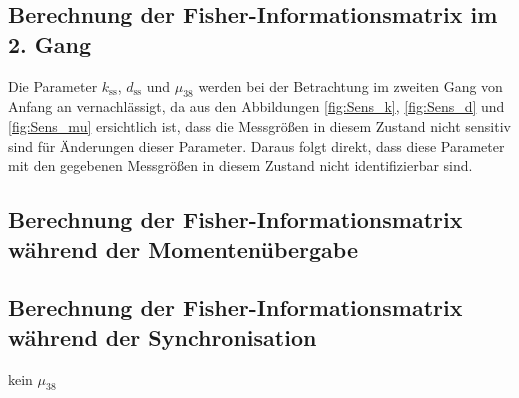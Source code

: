 \subsection{Berechnung der Fisher-Informationsmatrix im 2. Gang}
Die Parameter $k_\mathrm{ss}$, $d_\mathrm{ss}$ und $\mu_{38}$ werden bei der Betrachtung im zweiten Gang von Anfang an vernachlässigt, da aus den Abbildungen \ref{fig:Sens_k}, \ref{fig:Sens_d} und \ref{fig:Sens_mu} ersichtlich ist, dass die Messgrößen in diesem Zustand nicht sensitiv sind für Änderungen dieser Parameter. Daraus folgt direkt, dass diese Parameter mit den gegebenen Messgrößen in diesem Zustand nicht identifizierbar sind. 

\subsection{Berechnung der Fisher-Informationsmatrix während der Momentenübergabe}



\subsection{Berechnung der Fisher-Informationsmatrix während der Synchronisation}
kein $\mu_{38}$ 